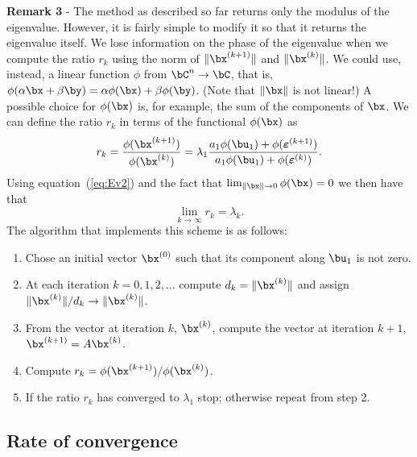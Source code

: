 \smallskip

\noindent
\textbf{Remark 3} - The method as described so far returns only the
modulus of the eigenvalue.  However, it is fairly simple to modify it
so that it returns the eigenvalue itself.  We lose information on the
phase of the eigenvalue when we compute the ratio $r_k$ using the norm
of $\| \bx^{(k+1)}\|$ and $\| \bx^{(k)}\|$. We could use, instead, a
linear function $\phi$ from $\bC^n \to \bC$, that is, $\phi(\alpha \bx
+ \beta \by) = \alpha \phi(\bx) + \beta \phi(\by)$. (Note that
$\|\bx\|$ is not linear!)  A possible choice for $\phi(\bx)$ is, for
example, the sum of the components of $\bx$.  We can define the ratio
$r_k$ in terms of the functional $\phi(\bx)$ as
%
\begin{equation}
 r_k = \frac{\phi( \bx^{(k+1)} )}{\phi(\bx^{(k)})} = \lambda_1 
        \frac{a_1 \phi(\bu_1) + \phi(\boldsymbol{\varepsilon}^{(k+1)})}
             {a_1 \phi(\bu_1) + \phi(\boldsymbol{\varepsilon}^{(k)})} .
 \label{eq:Ev7}
\end{equation}
%
Using equation~(\ref{eq:Ev2}) and the fact that $\lim_{\| \bx \| \to
  0} \phi(\bx) = 0$ we then have that
%
\begin{equation*}
 \lim_{k \to \infty} r_k = \lambda_k.
\end{equation*}
%
The algorithm that implements this scheme is as follows:

\begin{enumerate}
\item Chose an initial vector $\bx^{(0)}$ such that its
  component along $\bu_1$ is not zero.
\item At each iteration $k=0,1,2,\ldots$ compute $d_k = \|
  \bx^{(k)}\|$ and assign $\| \bx^{(k)}\|/d_k \to \| \bx^{(k)}\|$.
\item From the vector at iteration $k$, $\bx^{(k)}$, compute the
  vector at iteration $k+1$, $\bx^{(k+1)} = A \bx^{(k)}$.
\item Compute  $r_k = \phi(\bx^{(k+1)})/\phi(\bx^{(k)})$.
\item If the ratio $r_k$ has converged to $\lambda_1$ stop;
  otherwise repeat from step 2.
\end{enumerate}

\subsection{Rate of convergence}

